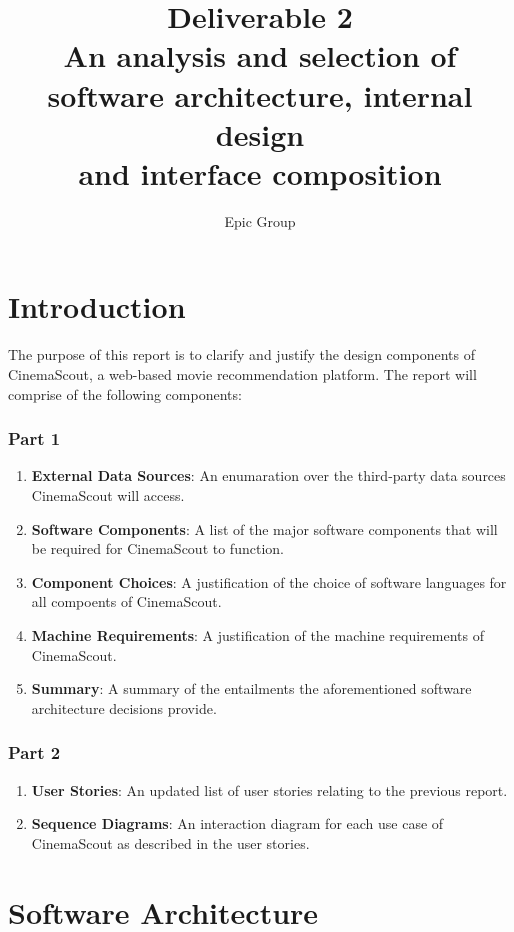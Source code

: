 \documentclass{article}
\begin{document}
\title{%
 Deliverable 2\\
 \large An analysis and selection of software architecture, internal design\\
 \large and interface composition
}
\author{Epic Group}
\date{}
\maketitle

\section*{Introduction}
The purpose of this report is to clarify and justify the design components of 
CinemaScout, a web-based movie recommendation platform. The report will comprise
of the following components:
\subsubsection*{Part 1}
\begin{enumerate}
\item \textbf{External Data Sources}: An enumaration over the third-party data
sources CinemaScout will access.
\item \textbf{Software Components}: A list of the major software components
that will be required for CinemaScout to function.
\item \textbf{Component Choices}: A justification of the choice of software
languages for all compoents of CinemaScout.
\item \textbf{Machine Requirements}: A justification of the machine requirements
of CinemaScout.
\item \textbf{Summary}: A summary of the entailments the aforementioned
software architecture decisions provide.
\end{enumerate}
\subsubsection*{Part 2}
\begin{enumerate}
\item \textbf{User Stories}: An updated list of user stories relating to the
previous report.
\item \textbf{Sequence Diagrams}: An interaction diagram for each use case
of CinemaScout as described in the user stories.
\end{enumerate}
\section{Software Architecture}
\end{document}
